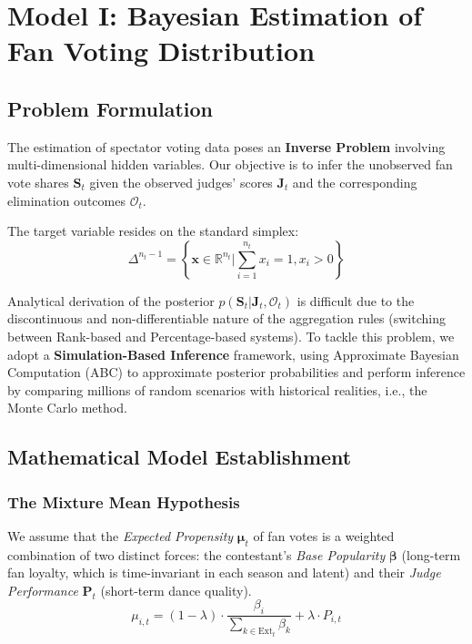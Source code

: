 \section{Model I: Bayesian Estimation of Fan Voting Distribution}

\subsection{Problem Formulation}
The estimation of spectator voting data poses
an \textbf{Inverse Problem} involving multi-dimensional hidden variables.
Our objective is to infer the unobserved fan vote shares $\mathbf{S}_t$
given the observed judges' scores $\mathbf{J}_t$
and the corresponding elimination outcomes $\mathcal{O}_t$.

The target variable resides on the standard simplex:
\begin{equation}
    \Delta^{n_t-1} = \left\{ \mathbf{x} \in \mathbb{R}^{n_t} \bigg| \sum_{i=1}^{n_t} x_i = 1, x_i > 0 \right\}
\end{equation}

Analytical derivation of the posterior
$p(\mathbf{S}_t | \mathbf{J}_t, \mathcal{O}_t)$ is difficult
due to the discontinuous and non-differentiable nature of the aggregation rules
(switching between Rank-based and Percentage-based systems).
To tackle this problem, we adopt a \textbf{Simulation-Based Inference} framework,
using Approximate Bayesian Computation (ABC)
to approximate posterior probabilities
and perform inference by comparing millions of random scenarios
with historical realities, i.e., the Monte Carlo method.

\subsection{Mathematical Model Establishment}

\subsubsection{The Mixture Mean Hypothesis}
We assume that the \textit{Expected Propensity} $\boldsymbol{\mu}_t$
of fan votes is a weighted combination of two distinct forces:
the contestant's \textit{Base Popularity}
$\boldsymbol{\beta}$ (long-term fan loyalty, which is time-invariant in each season and latent)
and their \textit{Judge Performance} $\mathbf{P}_t$ (short-term dance quality).
\begin{equation}
    \mu_{i,t} = (1 - \lambda) \cdot \frac{\beta_i}{\sum_{k \in \text{Ext}_t} \beta_k} + \lambda \cdot P_{i,t}
    \label{eq:mixture}
\end{equation}

